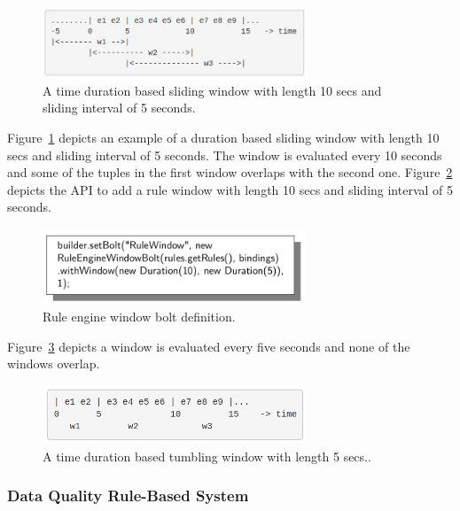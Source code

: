 \begin{figure}[h!]
  \centering
  \includegraphics[width=0.7\textwidth]{Figures/SlidingWindow.png}
  \caption{A time duration based sliding window with length 10 secs and sliding interval of 5 seconds.}
  \label{fig:SlideBolt}
\end{figure}

Figure~\ref{fig:SlideBolt} depicts an example of a duration based sliding window with length 10 secs and sliding interval of 5 seconds. The window is evaluated every 10 seconds and some of the tuples in the first window overlaps with the second one. Figure~\ref{fig:WindowBolt} depicts the API to add a rule window with length 10 secs and sliding interval of 5 seconds.

\begin{figure}[h!]
  \centering
  \includegraphics[width=0.7\textwidth]{Figures/WindowBolt.png}
  \caption{Rule engine window bolt definition.}
  \label{fig:WindowBolt}
\end{figure}

Figure~\ref{fig:TumbBolt} depicts a window is evaluated every five seconds and none of the windows overlap.

\begin{figure}[h!]
  \centering
  \includegraphics[width=0.7\textwidth]{Figures/TumblingWindow.png}
  \caption{A time duration based tumbling window with length 5 secs..}
  \label{fig:TumbBolt}
\end{figure}


\subsubsection{Data Quality Rule-Based System}

